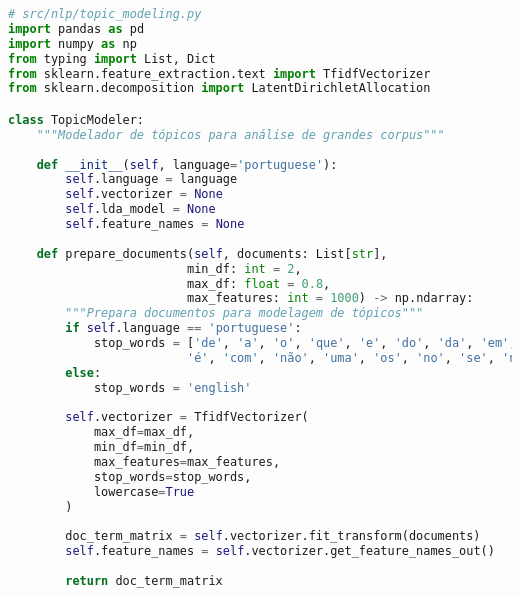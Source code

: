 \begin{pythonbox}
\begin{lstlisting}[language=Python]
# src/nlp/topic_modeling.py
import pandas as pd
import numpy as np
from typing import List, Dict
from sklearn.feature_extraction.text import TfidfVectorizer
from sklearn.decomposition import LatentDirichletAllocation

class TopicModeler:
    """Modelador de tópicos para análise de grandes corpus"""
    
    def __init__(self, language='portuguese'):
        self.language = language
        self.vectorizer = None
        self.lda_model = None
        self.feature_names = None
        
    def prepare_documents(self, documents: List[str], 
                         min_df: int = 2, 
                         max_df: float = 0.8,
                         max_features: int = 1000) -> np.ndarray:
        """Prepara documentos para modelagem de tópicos"""
        if self.language == 'portuguese':
            stop_words = ['de', 'a', 'o', 'que', 'e', 'do', 'da', 'em', 'um', 'para', 
                         'é', 'com', 'não', 'uma', 'os', 'no', 'se', 'na', 'por', 'mais']
        else:
            stop_words = 'english'
        
        self.vectorizer = TfidfVectorizer(
            max_df=max_df,
            min_df=min_df,
            max_features=max_features,
            stop_words=stop_words,
            lowercase=True
        )
        
        doc_term_matrix = self.vectorizer.fit_transform(documents)
        self.feature_names = self.vectorizer.get_feature_names_out()
        
        return doc_term_matrix
        \end{lstlisting}
\end{pythonbox}

